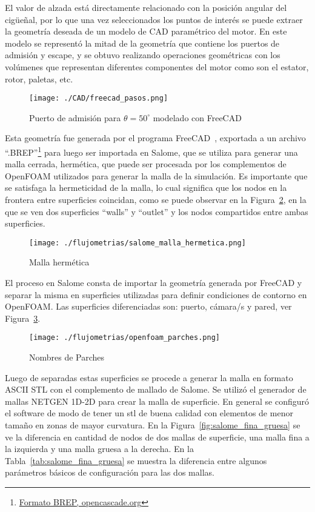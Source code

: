 El valor de alzada está directamente relacionado con la posición angular del
cigüeñal, por lo que una vez seleccionados los puntos de interés se puede
extraer la geometría deseada de un modelo de CAD paramétrico del motor.
%
En este modelo se representó la mitad de la geometría que contiene los puertos
de admisión y escape, y se obtuvo realizando operaciones geométricas con los
volúmenes que representan diferentes componentes del motor como son el estator,
rotor, paletas, etc.


\begin{figure}[h!]  \centering
\texttt{[image: ./CAD/freecad\_pasos.png]}
    \caption{Puerto de admisión para $\theta=50^{\circ}$ modelado con
FreeCAD}\label{fig:admision_50}
\end{figure}

Esta geometría fue generada por el programa FreeCAD~\parencite{freecad},
exportada a un archivo
``.BREP''\footnote{\href{https://dev.opencascade.org/doc/overview/html/specification\_\_brep\_format.html}{Formato
BREP, opencascade.org}} para luego ser importada en Salome\parencite{salome},
que se utiliza para generar una malla cerrada, hermética, que puede ser
procesada por los complementos de OpenFOAM utilizados para generar la malla de
la simulación.
%
Es importante que se satisfaga la hermeticidad de la malla, lo cual significa
que los nodos en la frontera entre superficies coincidan, como se puede observar
en la Figura~\ref{fig:salome_malla_hermetica}, en la que se ven dos superficies
``walls'' y ``outlet'' y los nodos compartidos entre ambas superficies.
%

\begin{figure}[h!]  \centering
\texttt{[image: ./flujometrias/salome\_malla\_hermetica.png]}
    \caption{Malla hermética}\label{fig:salome_malla_hermetica}
\end{figure}

El proceso en Salome consta de importar la geometría generada por FreeCAD y
separar la misma en superficies utilizadas para definir condiciones de contorno
en OpenFOAM.
%
Las superficies diferenciadas son: puerto, cámara/s y pared, ver
Figura~\ref{fig:openfoam_parches}.

\begin{figure}[h!]  \centering
\texttt{[image: ./flujometrias/openfoam\_parches.png]}
    \caption{Nombres de Parches}\label{fig:openfoam_parches}
\end{figure}

Luego de separadas estas superficies se procede a generar la malla en formato
ASCII STL con el complemento de mallado de Salome.
%
Se utilizó el generador de mallas NETGEN 1D-2D para crear la malla de
superficie.
%
En general se configuró el software de modo de tener un stl de buena
calidad con elementos de menor tamaño en zonas de mayor curvatura.
%
En la Figura~\ref{fig:salome_fina_gruesa} se ve la diferencia en cantidad de
nodos de dos mallas de superficie, una malla fina a la izquierda y una malla gruesa a la
derecha.
%
En la Tabla~\ref{tab:salome_fina_gruesa} se muestra la diferencia entre algunos
parámetros básicos de configuración para las dos mallas.
%

